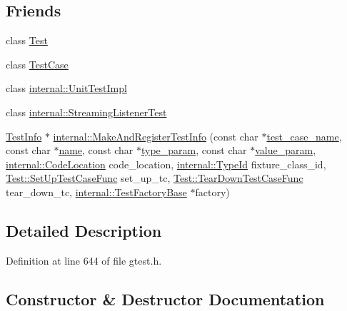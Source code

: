 \subsection*{Friends}
\begin{DoxyCompactItemize}
\item 
class \hyperlink{classtesting_1_1_test_info_a5b78b1c2e1fa07ffed92da365593eaa4}{Test}
\item 
class \hyperlink{classtesting_1_1_test_info_aff779e55b06adfa7c0088bd10253f0f0}{Test\+Case}
\item 
class \hyperlink{classtesting_1_1_test_info_acc0a5e7573fd6ae7ad1878613bb86853}{internal\+::\+Unit\+Test\+Impl}
\item 
class \hyperlink{classtesting_1_1_test_info_adc037d188dab349a94868991955c9cd4}{internal\+::\+Streaming\+Listener\+Test}
\item 
\hyperlink{classtesting_1_1_test_info}{Test\+Info} $\ast$ \hyperlink{classtesting_1_1_test_info_a70ddf8a12d8c05f17429f6381abc8ace}{internal\+::\+Make\+And\+Register\+Test\+Info} (const char $\ast$\hyperlink{classtesting_1_1_test_info_a26d22556d04b94c9cd15e28d74fef91c}{test\+\_\+case\+\_\+name}, const char $\ast$\hyperlink{classtesting_1_1_test_info_ab3d24cad310f0cde29a80b9a83949ff5}{name}, const char $\ast$\hyperlink{classtesting_1_1_test_info_af15d5c533a7237ffc183bc4c924dfcf4}{type\+\_\+param}, const char $\ast$\hyperlink{classtesting_1_1_test_info_a9671fbc0effcb32e98803888dc166a66}{value\+\_\+param}, \hyperlink{structtesting_1_1internal_1_1_code_location}{internal\+::\+Code\+Location} code\+\_\+location, \hyperlink{namespacetesting_1_1internal_ab1114197d3c657d8b7f8e0c5caa12d00}{internal\+::\+Type\+Id} fixture\+\_\+class\+\_\+id, \hyperlink{classtesting_1_1_test_a5f2a051d1d99c9b784c666c586186cf9}{Test\+::\+Set\+Up\+Test\+Case\+Func} set\+\_\+up\+\_\+tc, \hyperlink{classtesting_1_1_test_aa0f532e93b9f3500144c53f31466976c}{Test\+::\+Tear\+Down\+Test\+Case\+Func} tear\+\_\+down\+\_\+tc, \hyperlink{classtesting_1_1internal_1_1_test_factory_base}{internal\+::\+Test\+Factory\+Base} $\ast$factory)
\end{DoxyCompactItemize}


\subsection{Detailed Description}


Definition at line 644 of file gtest.\+h.



\subsection{Constructor \& Destructor Documentation}
